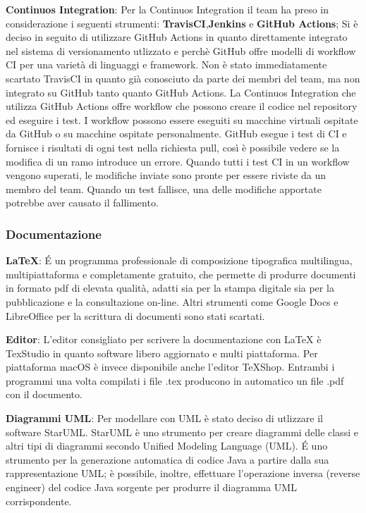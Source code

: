\begin{description}
\item{\textbf{Continuos Integration}}:  Per la Continuos Integration il team ha preso in considerazione i seguenti strumenti: \textbf{TravisCI},\textbf{Jenkins} e \textbf{GitHub Actions};
Si è deciso in seguito di utilizzare GitHub Actions in quanto direttamente integrato nel sistema di versionamento utlizzato e perchè 
GitHub offre modelli di workflow CI per una varietà di linguaggi e framework.
Non è stato immediatamente scartato TravisCI in quanto già conosciuto da parte dei membri del team, ma non integrato su GitHub tanto quanto GitHub Actions.
La Continuos Integration che utilizza GitHub Actions offre workflow che possono creare il codice nel repository ed eseguire i test. 
I workflow possono essere eseguiti su macchine virtuali ospitate da GitHub o su macchine ospitate personalmente.
GitHub esegue i test di CI e fornisce i risultati di ogni test nella richiesta pull, così è possibile vedere se la modifica di un ramo introduce un errore. 
Quando tutti i test CI in un workflow vengono superati, le modifiche inviate sono pronte per essere riviste da un membro del team. 
Quando un test fallisce, una delle modifiche apportate potrebbe aver causato il fallimento. 

\end{description}

\subsubsection{Documentazione} 
\begin{description}
\item{\textbf{\LaTeX}}: \'E un programma professionale di composizione tipografica multilingua,
multipiattaforma e completamente gratuito, che permette di produrre documenti in formato pdf di elevata qualità, adatti sia per la stampa digitale sia
per la pubblicazione e la consultazione on-line. 
Altri strumenti come Google Docs e LibreOffice per la scrittura di documenti sono stati scartati. 

\item{\textbf{Editor}}: L’editor  consigliato  per  scrivere  la  documentazione  con  {\LaTeX}  è TexStudio  in  quanto  software  libero  aggiornato  e  multi  piattaforma. Per piattaforma macOS è invece disponibile
anche l'editor TeXShop. Entrambi i programmi una volta compilati i file .tex producono in automatico un file .pdf con il documento.

\item{\textbf{Diagrammi UML}}: Per modellare con UML è stato deciso di utlizzare il software StarUML. StarUML è uno strumento per creare diagrammi delle classi e altri tipi di diagrammi secondo Unified Modeling Language (UML). 
\'E uno strumento per la generazione automatica di codice Java a partire dalla sua rappresentazione UML; è possibile, inoltre, effettuare l’operazione inversa (reverse engineer) del codice Java sorgente per produrre il diagramma UML corrispondente. 
\end{description}

